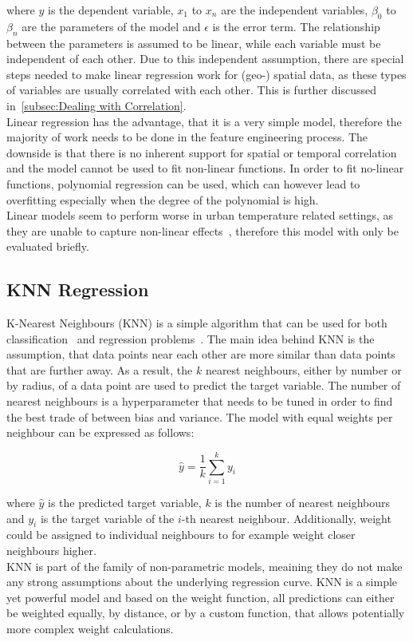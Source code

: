 where $y$ is the dependent variable, $x_1$ to $x_n$ are the independent variables, $\beta_0$ to $\beta_n$ are the parameters of the model and $\epsilon$ is the error term. The relationship between the parameters is assumed to be linear, while each variable must be independent of each other. Due to this independent assumption, there are special steps needed to make linear regression work for (geo-) spatial data, as these types of variables are usually correlated with each other. This is further discussed in~\ref{subsec:Dealing with Correlation}.\\
Linear regression has the advantage, that it is a very simple model, therefore the majority of work needs to be done in the feature engineering process. The downside is that there is no inherent support for spatial or temporal correlation and the model cannot be used to fit non-linear functions. In order to fit no-linear functions, polynomial regression can be used, which can however lead to overfitting especially when the degree of the polynomial is high.\\
Linear models seem to perform worse in urban temperature related settings, as they are unable to capture non-linear effects~\cite{voelkel2017towards}, therefore this model with only be evaluated briefly.

\subsection{KNN Regression}

K-Nearest Neighbours (KNN) is a simple algorithm that can be used for both classification~\cite{cover1967nearest} and regression problems~\cite{altman1992introduction}. The main idea behind KNN is the assumption, that data points near each other are more similar than data points that are further away. As a result, the $k$ nearest neighbours, either by number or by radius, of a data point are used to predict the target variable. The number of nearest neighbours is a hyperparameter that needs to be tuned in order to find the best trade of between bias and variance. The model with equal weights per neighbour can be expressed as follows:

\begin{equation}
    \hat{y} = \frac{1}{k} \sum_{i=1}^{k} y_i
\end{equation}

where $\hat{y}$ is the predicted target variable, $k$ is the number of nearest neighbours and $y_i$ is the target variable of the $i$-th nearest neighbour. Additionally, weight could be assigned to individual neighbours to for example weight closer neighbours higher.\\
KNN is part of the family of non-parametric models, meaining they do not make any strong assumptions about the underlying regression curve. KNN is a simple yet powerful model and based on the weight function, all predictions can either be weighted equally, by distance, or by a custom function, that allows potentially more complex weight calculations.

